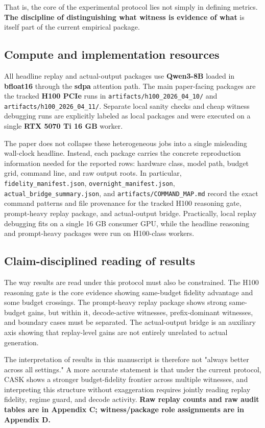 That is, the core of the experimental protocol lies not simply in defining metrics. \textbf{The discipline of distinguishing what witness is evidence of what} is itself part of the current empirical package.


\subsection{Compute and implementation resources}


All headline replay and actual-output packages use \textbf{Qwen3-8B} loaded in \textbf{bfloat16} through the \textbf{sdpa} attention path. The main paper-facing packages are the tracked \textbf{H100 PCIe} runs in \texttt{artifacts/h100\_2026\_04\_10/} and \texttt{artifacts/h100\_2026\_04\_11/}. Separate local sanity checks and cheap witness debugging runs are explicitly labeled as local packages and were executed on a single \textbf{RTX 5070 Ti 16 GB} worker. \CASKRepoSentence


The paper does not collapse these heterogeneous jobs into a single misleading wall-clock headline. Instead, each package carries the concrete reproduction information needed for the reported rows: hardware class, model path, budget grid, command line, and raw output roots. In particular, \texttt{fidelity\_manifest.json}, \texttt{overnight\_manifest.json}, \texttt{actual\_bridge\_summary.json}, and \texttt{artifacts/COMMAND\_MAP.md} record the exact command patterns and file provenance for the tracked H100 reasoning gate, prompt-heavy replay package, and actual-output bridge. Practically, local replay debugging fits on a single 16 GB consumer GPU, while the headline reasoning and prompt-heavy packages were run on H100-class workers.


\subsection{Claim-disciplined reading of results}


The way results are read under this protocol must also be constrained. The H100 reasoning gate is the core evidence showing same-budget fidelity advantage and some budget crossings. The prompt-heavy replay package shows strong same-budget gains, but within it, decode-active witnesses, prefix-dominant witnesses, and boundary cases must be separated. The actual-output bridge is an auxiliary axis showing that replay-level gains are not entirely unrelated to actual generation.


The interpretation of results in this manuscript is therefore not "always better across all settings." A more accurate statement is that under the current protocol, CASK shows a stronger budget-fidelity frontier across multiple witnesses, and interpreting this structure without exaggeration requires jointly reading replay fidelity, regime guard, and decode activity. \textbf{Raw replay counts and raw audit tables are in Appendix C; witness/package role assignments are in Appendix D.}


